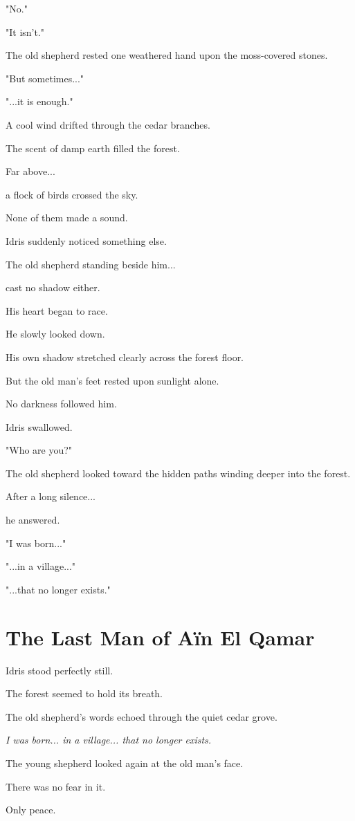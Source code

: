 \documentclass[12pt,openany]{book}
\begin{document}
"No."

"It isn't."

The old shepherd rested one weathered hand upon the moss-covered stones.

"But sometimes..."

"...it is enough."

A cool wind drifted through the cedar branches.

The scent of damp earth filled the forest.

Far above...

a flock of birds crossed the sky.

None of them made a sound.

Idris suddenly noticed something else.

The old shepherd standing beside him...

cast no shadow either.

His heart began to race.

He slowly looked down.

His own shadow stretched clearly across the forest floor.

But the old man's feet rested upon sunlight alone.

No darkness followed him.

Idris swallowed.

"Who are you?"

The old shepherd looked toward the hidden paths winding deeper into the forest.

After a long silence...

he answered.

"I was born..."

"...in a village..."

"...that no longer exists."
\section*{The Last Man of Aïn El Qamar}

Idris stood perfectly still.

The forest seemed to hold its breath.

The old shepherd's words echoed through the quiet cedar grove.

\emph{I was born... in a village... that no longer exists.}

The young shepherd looked again at the old man's face.

There was no fear in it.

Only peace.
\end{document}
